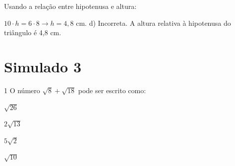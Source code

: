 \begin{escolha}
\begin{boxmedio}
\begin{boxmedio}
{\begin{boxpeq}
\begin{boxpeq}
{\begin{boxpeq}
\begin{boxmedio}
\begin{boxmedio}
\begin{boxpeq}
\begin{boxmedio}
\begin{boxpeq}
\begin{boxpeq}
\begin{boxpeq}
\begin{boxpeq}
\begin{boxmedio}
{\begin{boxmedio}
\begin{boxmedio}
\begin{boxpeq}
\begin{boxmedio}
\begin{boxpeq}
\begin{boxpeq}
\begin{boxpeq}
\begin{escolha}
{\begin{boxmedio}
\begin{boxpeq}
\begin{boxpeq}
\begin{boxpeq}
\begin{boxpeq}
\begin{boxpeq}
\begin{boxmedio}
\begin{boxpeq}
\begin{boxpeq}
\begin{boxpeq}
{\begin{boxpeq}
\begin{boxmedio}
\begin{boxpeq}
\begin{boxpeq}
\begin{boxpeq}
{\begin{boxpeq}
\begin{boxmedio}
{\begin{boxpeq}
\begin{boxpeq}
\begin{boxmedio}
\begin{boxmedio}
\begin{boxpeq}
\begin{boxpeq}
{\begin{boxpeq}
\begin{boxpeq}
\begin{boxpeq}
\begin{boxpeq}
\begin{boxpeq}
\begin{escolha}
\begin{escolha}
{\begin{boxmedio}
\begin{boxpeq}
\begin{q°}
\begin{boxmedio}
\begin{boxpeq}
\begin{boxpeq}
\begin{boxmedio}
\begin{boxmedio}
\begin{boxmedio}
\begin{boxmedio}
{\begin{escolha}
\begin{escolha}
\begin{escolha}
\begin{escolha}
\begin{escolha}
\begin{escolha}
{\begin{figure}
\end{figure}

Usando a relação entre hipotenusa e altura: 

$10 \cdot h = 6 \cdot 8 \rightarrow h = 4,8$ cm.
d) Incorreta. A altura relativa à hipotenusa do triângulo é 4,8 cm.}

\chapter{Simulado 3}

\num{1} O número $\sqrt{8} + \sqrt{18}$ pode ser escrito como:

\begin{escolha}

  \item $\sqrt{26}$
  \item $2\sqrt{13}$
  \item $5\sqrt{2}$
  \item $\sqrt{10}$

\end{escolha}

\end{escolha}
\end{escolha}
\end{escolha}
\end{escolha}
\end{escolha}
\end{escolha}}
\end{boxmedio}
\end{boxmedio}
\end{boxmedio}
\end{boxmedio}
\end{boxpeq}
\end{boxpeq}
\end{boxmedio}
\end{q°}
\end{boxpeq}
\end{boxmedio}}
\end{escolha}
\end{escolha}
\end{boxpeq}
\end{boxpeq}
\end{boxpeq}
\end{boxpeq}
\end{boxpeq}}
\end{boxpeq}
\end{boxpeq}
\end{boxmedio}
\end{boxmedio}
\end{boxpeq}
\end{boxpeq}}
\end{boxmedio}
\end{boxpeq}}
\end{boxpeq}
\end{boxpeq}
\end{boxpeq}
\end{boxmedio}
\end{boxpeq}}
\end{boxpeq}
\end{boxpeq}
\end{boxpeq}
\end{boxmedio}
\end{boxpeq}
\end{boxpeq}
\end{boxpeq}
\end{boxpeq}
\end{boxpeq}
\end{boxmedio}}
\end{escolha}
\end{boxpeq}
\end{boxpeq}
\end{boxpeq}
\end{boxmedio}
\end{boxpeq}
\end{boxmedio}
\end{boxmedio}}
\end{boxmedio}
\end{boxpeq}
\end{boxpeq}
\end{boxpeq}
\end{boxpeq}
\end{boxmedio}
\end{boxpeq}
\end{boxmedio}
\end{boxmedio}
\end{boxpeq}}
\end{boxpeq}
\end{boxpeq}}
\end{boxmedio}
\end{boxmedio}
\end{escolha}
